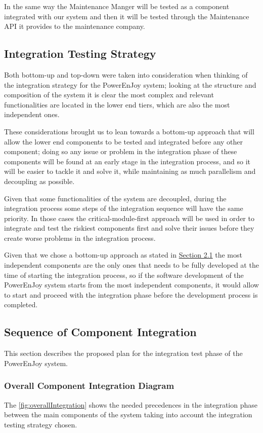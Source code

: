 In the same way the Maintenance Manger will be tested as a component integrated with our system and then it will be tested through the Maintenance API it provides to the maintenance company. 

\subsection{Integration Testing Strategy} \label{sec:intStrategy}
Both bottom-up and top-down were taken into consideration when thinking of the integration strategy for the PowerEnJoy system; looking at the structure and composition of the system it is clear the most complex and relevant functionalities are located in the lower end tiers, which are also the most independent ones.

These considerations brought us to lean towards a bottom-up approach that will allow the lower end components to be tested and integrated before any other component; doing so any issue or problem in the integration phase of these components will be found at an early stage in the integration process, and so it will be easier to tackle it and solve it, while maintaining as much parallelism and decoupling as possible.

Given that some functionalities of the system are decoupled, during the integration process some steps of the integration sequence will have the same priority. In those cases the critical-module-first approach will be used in order to integrate and test the riskiest  components first and solve their issues before they create worse problems in the integration process.

Given that we chose a bottom-up approach as stated in \hyperref[sec:entryCriteria]{Section 2.1} the most independent components are the only ones that needs to be fully developed at the time of starting the integration process, so if the software development of the PowerEnJoy system starts from the most independent components, it would allow to start and proceed with the integration phase before the development process is completed.

\subsection{Sequence of Component Integration}
This section describes the proposed plan for the integration test phase of the PowerEnJoy system.

\subsubsection{Overall Component Integration Diagram}  \label{sec:overallPrecedences}
The \autoref{fig:overallIntegration} shows the needed precedences in the integration phase between the main components of the system taking into account the integration testing strategy chosen.

